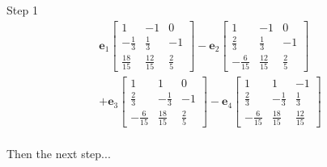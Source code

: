 \documentclass{tufte-book}
\newcommand{\vct}{\mathbf}
\theoremstyle{mytheoremstyle}
\theoremstyle{mylemstyle}
\theoremstyle{mydefstyle}
\begin{document}
Step 1
\begin{multline*}
\vct{e}_1
\begin{bmatrix}
1 & -1 & 0 \\
-\frac{1}{3} &\frac{1}{3} & -1 \\
\frac{18}{15} &\frac{12}{15} & \frac{2}{5}
\end{bmatrix}
-
\vct{e}_2
\begin{bmatrix}
1 & -1 & 0 \\
\frac{2}{3} &\frac{1}{3} & -1 \\
-\frac{6}{15} &\frac{12}{15} & \frac{2}{5}
\end{bmatrix}\\
+\vct{e}_3
\begin{bmatrix}
1 & 1 & 0 \\
\frac{2}{3} & -\frac{1}{3} & -1 \\
-\frac{6}{15} & \frac{18}{15} & \frac{2}{5}
\end{bmatrix}
- \vct{e}_4
\begin{bmatrix}
1 & 1 & -1 \\
\frac{2}{3} & -\frac{1}{3} &\frac{1}{3}\\
-\frac{6}{15} & \frac{18}{15} &\frac{12}{15}
\end{bmatrix} \\
\end{multline*}

Then the next step...
\end{document}
